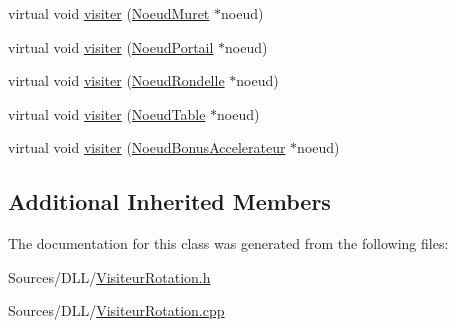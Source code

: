 \begin{DoxyCompactItemize}
\item 
virtual void \hyperlink{group__inf2990_gaeb02b7e545154c48ea047ba90aa547ee}{visiter} (\hyperlink{class_noeud_muret}{Noeud\+Muret} $\ast$noeud)
\item 
virtual void \hyperlink{group__inf2990_gaed9327add2f03b3874c84629b7f8d1dd}{visiter} (\hyperlink{class_noeud_portail}{Noeud\+Portail} $\ast$noeud)
\item 
virtual void \hyperlink{group__inf2990_gae090f20239c6bf70aa11b858aa79a4fa}{visiter} (\hyperlink{class_noeud_rondelle}{Noeud\+Rondelle} $\ast$noeud)
\item 
virtual void \hyperlink{group__inf2990_gae1865615073c00327902b12b1be14332}{visiter} (\hyperlink{class_noeud_table}{Noeud\+Table} $\ast$noeud)
\item 
virtual void \hyperlink{group__inf2990_ga30b9ecc99d9bb3f86963f795ee76a1c4}{visiter} (\hyperlink{class_noeud_bonus_accelerateur}{Noeud\+Bonus\+Accelerateur} $\ast$noeud)
\end{DoxyCompactItemize}
\subsection*{Additional Inherited Members}


The documentation for this class was generated from the following files\+:\begin{DoxyCompactItemize}
\item 
Sources/\+D\+L\+L/\hyperlink{_visiteur_rotation_8h}{Visiteur\+Rotation.\+h}\item 
Sources/\+D\+L\+L/\hyperlink{_visiteur_rotation_8cpp}{Visiteur\+Rotation.\+cpp}\end{DoxyCompactItemize}
